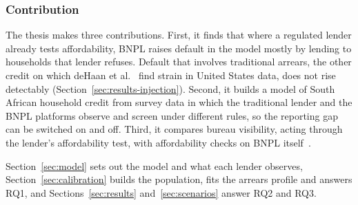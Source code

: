 \subsubsection*{Contribution}

The thesis makes three contributions. First, it finds that where a regulated lender already tests
affordability, \ac{BNPL} raises default in the model mostly by lending to households that lender
refuses. Default that involves traditional arrears, the other credit on which deHaan et
al.~\citeyearpar{dehaan2024bnpl} find strain in United States data, does not rise detectably
(Section~\ref{sec:results-injection}). Second, it builds a model of South African household credit
from survey data in which the traditional lender and the \ac{BNPL} platforms observe and screen
under different rules, so the reporting gap can be switched on and off. Third, it compares bureau
visibility, acting through the lender's affordability test, with affordability checks on \ac{BNPL}
itself~\citep{fca_ps26_1}.

Section~\ref{sec:model} sets out the model and what each lender observes,
Section~\ref{sec:calibration} builds the population, fits the arrears profile and answers RQ1, and
Sections~\ref{sec:results} and~\ref{sec:scenarios} answer RQ2 and RQ3.
